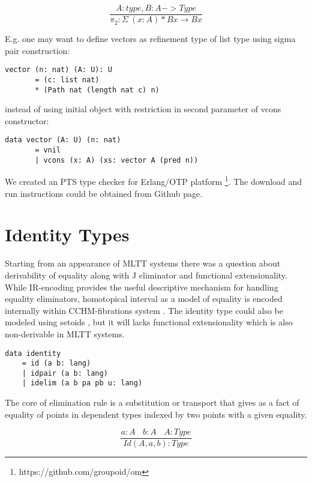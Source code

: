 \documentclass{aip-cp}
\begin{document}
\begin{equation}
\tag{$\pi_1$-elimination}
\dfrac
{A: type, B: A -> Type}
{\pi_2 : \Sigma\ (x:A) * B x \rightarrow B x}
\end{equation}

\newpage
E.g. one may want to define vectors as refinement type of list type using sigma pair construction:

\begin{lstlisting}[mathescape=true]
    vector (n: nat) (A: U): U
       = (c: list nat)
       * (Path nat (length nat c) n)
\end{lstlisting}

instead of using initial object with restriction in second parameter of vcons constructor:

\begin{lstlisting}[mathescape=true]
    data vector (A: U) (n: nat)
       = vnil
       | vcons (x: A) (xs: vector A (pred n))
\end{lstlisting}

We created an PTS type checker for Erlang/OTP platform \footnote{https://github.com/groupoid/om}.
The download and run instructions could be obtained from Github page.


\section{Identity Types}

Starting from an appearance of MLTT systems there was a question about derivability of equality
along with J eliminator and functional extensionality. While IR-encoding \cite{Dagand13} provides
the useful descriptive mechanism for handling equality eliminators, homotopical interval
as a model of equality is encoded internally within CCHM-fibrations system \cite{Orton17}. The
identity type could also be modeled using setoids \cite{Bishop67}, but it will lacks functional
extensionality which is also non-derivable in MLTT systems.

\begin{lstlisting}[mathescape=true]
data identity
    = id (a b: lang)
    | idpair (a b: lang)
    | idelim (a b pa pb u: lang)
\end{lstlisting}

The core of elimination rule is a substitution or transport that gives as
a fact of equality of points in dependent types indexed by two points with a given equality.

\begin{equation}
\tag{$Id$-formation}
\dfrac
  {a:A\ \ \ \ b:A\ \ \ \ A:Type}
  {Id(A,a,b) : Type}
\end{equation}
\end{document}
